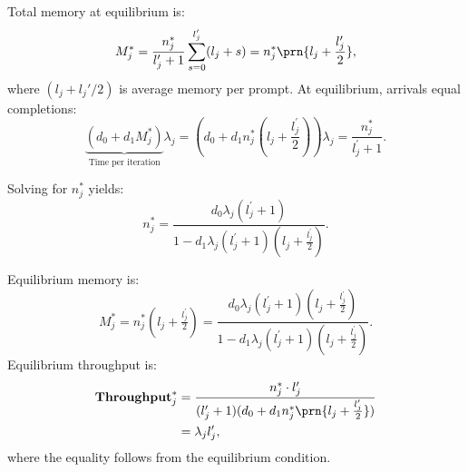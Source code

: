 Total memory at equilibrium is:
\begin{equation}
    M_j^* = \frac{n_j^*}{l_j^{\prime}+1}\sum_{s=0}^{l_j^{\prime}}(l_j+s) = n_j^*\prn{l_j+\frac{l_j'}{2}},
\end{equation}
where $(l_j + l_j'/2)$ is average memory per prompt. At equilibrium, arrivals equal completions:
$$ \underset{\text{Time per iteration}}{\underbrace{(d_0+d_1M_j^{*} )}}\lambda_j =\left(d_0+d_1 n_j^*\left( l_j +\frac{l_j^{\prime}}{2} \right) \right)\lambda_j= \frac{n_j^*}{l_j^{\prime}+1}. $$

Solving for $n_j^*$ yields:
$$n_j^* = \frac{d_0\lambda_j(l_j^{\prime}+1)}{1-d_1\lambda_j(l_j^{\prime}+1)(l_j+\frac{l_j^{\prime}}{2})}.$$

Equilibrium memory is:
\begin{equation}
    \label{eq:memory_single}
M_j^* = n_j^*\left( l_j+\tfrac{l_j^{\prime}}{2} \right)
=  \frac{d_0\lambda_j(l_j^{\prime}+1)\left( l_j+\tfrac{l_j^{\prime}}{2} \right) }{1-d_1\lambda_j(l_j^{\prime}+1)(l_j+\tfrac{l_j^{\prime}}{2})}.
\end{equation}
Equilibrium throughput is:
\begin{equation}\label{eq:throughput_fluid}
\begin{aligned}
\throughput_j^* &= \frac{n_j^* \cdot l_j'}{(l_j'+1)(d_0+d_1n_j^*\prn{l_j+\tfrac{l_j'}{2}})} \\
&= \lambda_j l_j',
\end{aligned}
\end{equation}
where the equality follows from the equilibrium condition.

